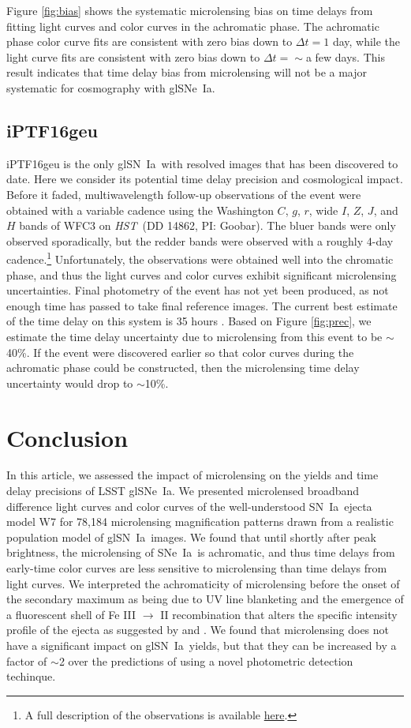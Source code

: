 \documentclass[iop,apj,numberedappendix,twocolappendix]{emulateapj}
\newcommand{\snia}{{\rm SN~Ia}}
\newcommand{\sneia}{{\rm SNe~Ia}}
\newcommand{\hst}{\textit{HST}}
\begin{document}
Figure \ref{fig:bias} shows the systematic microlensing bias on time delays from fitting light curves and color curves in the achromatic phase. 
The achromatic phase color curve fits are consistent with zero bias down to $\Delta t = 1$ day, while the light curve fits are consistent with zero bias down to $\Delta t = \sim$a few days. 
This result indicates that time delay bias from microlensing will not be a major systematic for cosmography with gl\sneia. 

\subsection{iPTF16geu}
iPTF16geu is the only gl\snia\ with resolved images that has been discovered to date. 
Here we consider its potential time delay precision and cosmological impact. 
Before it faded, multiwavelength follow-up observations of the event were obtained with a variable cadence using the Washington $C$, $g$, $r$, wide $I$, $Z$, $J$, and $H$ bands of WFC3 on \hst\ (DD 14862, PI: Goobar). 
The bluer bands were only observed sporadically, but the redder bands were observed with a roughly 4-day cadence.\footnote{A full description of the observations is available \href{ https://archive.stsci.edu/proposal\_search.php?mission=hst\&id=14862}{here}.}
Unfortunately, the observations were obtained well into the chromatic phase, and thus the light curves and color curves exhibit significant microlensing uncertainties. 
Final photometry of the event has not yet been produced, as not enough time has passed to take final reference images. 
The current best estimate of the time delay on this system is 35 hours \citep{goobar16}.
Based on Figure \ref{fig:prec}, we estimate the time delay uncertainty due to microlensing from this event to be $\sim$40\%. 
If the event were discovered earlier so that color curves during the achromatic phase could be constructed, then the microlensing time delay uncertainty would drop to $\sim$10\%. 


\section{Conclusion}
\label{sec:conclusion}
In this article, we assessed the impact of microlensing on the yields and time delay precisions of LSST gl\sneia.
We presented microlensed broadband difference light curves and color curves of the well-understood \snia\ ejecta model W7 for 78,184 microlensing magnification patterns drawn from a realistic population model of gl\snia\ images.
We found that until shortly after peak brightness, the microlensing of \sneia\ is achromatic, and thus time delays from early-time color curves are less sensitive to microlensing than time delays from light curves.
We interpreted the achromaticity of microlensing before the onset of the secondary maximum as being due to UV line blanketing and the emergence of a fluorescent shell of Fe III $\rightarrow$ II recombination that alters the specific intensity profile of the ejecta as suggested by \cite{2bump} and \cite{kw07}.
We found that microlensing does not have a significant impact on gl\snia\ yields, but that they can be increased by a factor of $\sim$2 over the predictions of \cite{gn17} using a novel photometric detection techinque. 
\end{document}
